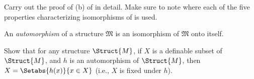 \documentclass[../../../include/open-logic-section]{subfiles}
\begin{document}
\begin{prob}
Carry out the proof of (b) of  in
detail. Make sure to note where each of the five properties
characterizing isomorphisms of 
is used.
\end{prob}

\begin{defn}
An \emph{automorphism} of a structure $\mathfrak{M}$ is an isomorphism
of $\mathfrak{M}$ onto itself.
\end{defn}

\begin{prob}
Show that for any structure $\Struct{M}$, if $X$ is a definable subset
of $\Struct{M}$, and $h$ is an automorphism of $\Struct{M}$, then $X
= \Setabs{h(x)}{x \in X}$ (i.e., $X$ is fixed under $h$).
\end{prob}
\end{document}
